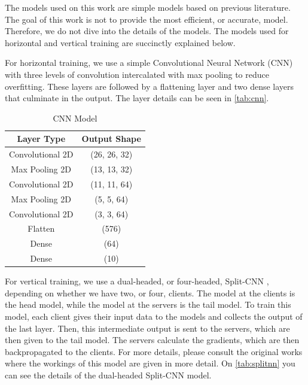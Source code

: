 The models used on this work are simple models based on previous literature. The goal of this work is not to provide the most efficient, or accurate, model. Therefore, we do not dive into the details of the models. The models used for horizontal and vertical training are succinctly explained below.

For horizontal training, we use a simple Convolutional Neural Network (CNN) with three levels of convolution intercalated with max pooling to reduce overfitting. These layers are followed by a flattening layer and two dense layers that culminate in the output. The layer details can be seen in \autoref{tab:cnn}.

\begin{table}[!h]
    \begin{tabular}{c|c}
        \hline \hline
        Layer Type       & Output Shape \\ \hline \hline
        Convolutional 2D & (26, 26, 32) \\ \hline
        Max Pooling 2D   & (13, 13, 32) \\ \hline
        Convolutional 2D & (11, 11, 64) \\ \hline
        Max Pooling 2D   & (5, 5, 64)   \\ \hline
        Convolutional 2D & (3, 3, 64)   \\ \hline
        Flatten          & (576)        \\ \hline
        Dense            & (64)         \\ \hline
        Dense            & (10)         \\ \hline
    \end{tabular}
    \caption{CNN Model}
    \label{tab:cnn}
\end{table}

For vertical training, we use a dual-headed, or four-headed, Split-CNN \cite{10.1145/3297858.3304038, 10.48550/arxiv.2104.00489}, depending on whether we have two, or four, clients. The model at the clients is the head model, while the model at the servers is the tail model. To train this model, each client gives their input data to the models and collects the output of the last layer. Then, this intermediate output is sent to the servers, which are then given to the tail model. The servers calculate the gradients, which are then backpropagated to the clients. For more details, please consult the original works where the workings of this model are given in more detail. On \autoref{tab:splitnn} you can see the details of the dual-headed Split-CNN model.

